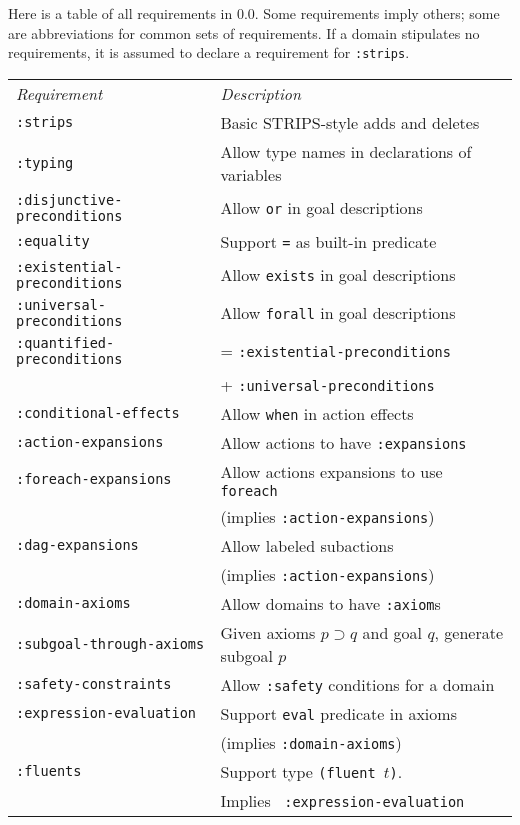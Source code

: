 \begin{sloppypar}
Here is a table of all requirements in \lang{} 0.0.  Some requirements
imply others; some 
are abbreviations for common sets of requirements.  If a domain
stipulates no requirements, it is assumed to declare a requirement for
{\tt :strips}.
\begin{center}
\begin{tabular}{ll}
\it Requirement & \it Description \\
\tt :strips & Basic STRIPS-style adds and deletes \\
\tt :typing & Allow type names in declarations of variables \\
\tt :disjunctive-preconditions & Allow {\tt or} in goal descriptions \\
\tt :equality & Support {\tt =} as built-in predicate \\
\tt :existential-preconditions & Allow  {\tt exists} in
goal descriptions \\
\tt :universal-preconditions & Allow {\tt forall}  in
goal descriptions \\
\tt :quantified-preconditions & = {\tt :existential-preconditions}  \\
  & + {\tt :universal-preconditions} \\
\tt :conditional-effects & Allow {\tt when} in action effects \\
\tt :action-expansions & Allow actions to have {\tt :expansions} \\
\tt :foreach-expansions & Allow actions expansions to use {\tt
foreach} \\
   & (implies {\tt :action-expansions}) \\
\tt :dag-expansions & Allow labeled subactions \\ 
  &                 (implies {\tt :action-expansions}) \\
\tt :domain-axioms & Allow domains to have {\tt :axiom}s \\
\tt :subgoal-through-axioms & Given axioms $p\supset q$ and goal $q$,
generate subgoal $p$ \\
\tt :safety-constraints & Allow {\tt :safety} conditions for a domain
\\
\tt :expression-evaluation & Support {\tt eval} predicate in axioms \\
 & (implies {\tt :domain-axioms}) \\
\tt :fluents & Support type {\tt (fluent $t$)}.  \\
&  Implies {\tt
:expression-evaluation} \\

\end{tabular}
\end{center}
\end{sloppypar}
